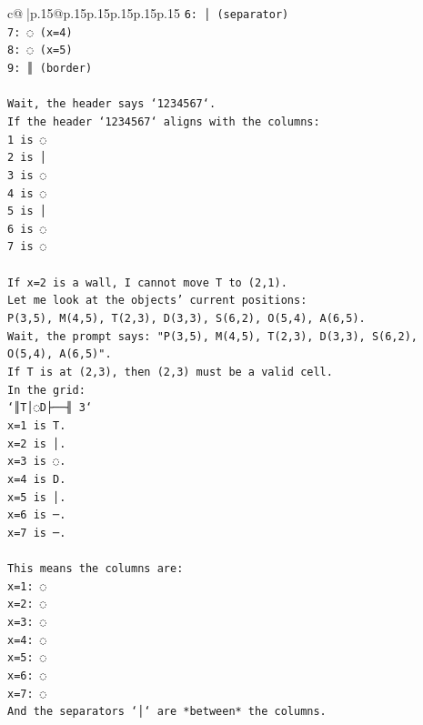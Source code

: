 \documentclass{article}
\begin{document}
{\begin{supertabular}{c@{$\;$}|p{.15\linewidth}@{}p{.15\linewidth}p{.15\linewidth}p{.15\linewidth}p{.15\linewidth}p{.15\linewidth}}
{{{\texttt{6: │ (separator)} \\
\texttt{7: ◌ (x=4)} \\
\texttt{8: ◌ (x=5)} \\
\texttt{9: ║ (border)} \\
\\ 
\texttt{Wait, the header says `1234567`.} \\
\texttt{If the header `1234567` aligns with the columns:} \\
\texttt{1 is ◌} \\
\texttt{2 is │} \\
\texttt{3 is ◌} \\
\texttt{4 is ◌} \\
\texttt{5 is │} \\
\texttt{6 is ◌} \\
\texttt{7 is ◌} \\
\\ 
\texttt{If x=2 is a wall, I cannot move T to (2,1).} \\
\texttt{Let me look at the objects' current positions:} \\
\texttt{P(3,5), M(4,5), T(2,3), D(3,3), S(6,2), O(5,4), A(6,5).} \\
\texttt{Wait, the prompt says: "P(3,5), M(4,5), T(2,3), D(3,3), S(6,2), O(5,4), A(6,5)".} \\
\texttt{If T is at (2,3), then (2,3) must be a valid cell.} \\
\texttt{In the grid:} \\
\texttt{`║T│◌D├──╢ 3`} \\
\texttt{x=1 is T.} \\
\texttt{x=2 is │.} \\
\texttt{x=3 is ◌.} \\
\texttt{x=4 is D.} \\
\texttt{x=5 is │.} \\
\texttt{x=6 is ─.} \\
\texttt{x=7 is ─.} \\
\\ 
\texttt{This means the columns are:} \\
\texttt{x=1: ◌} \\
\texttt{x=2: ◌} \\
\texttt{x=3: ◌} \\
\texttt{x=4: ◌} \\
\texttt{x=5: ◌} \\
\texttt{x=6: ◌} \\
\texttt{x=7: ◌} \\
\texttt{And the separators `│` are *between* the columns.} \\
}}}
\end{supertabular}}
\end{document}
